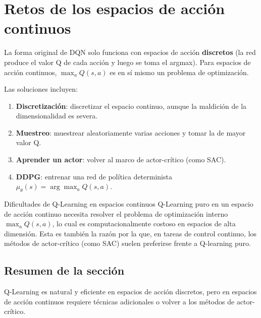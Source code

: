 \section{Retos de los espacios de acción continuos}

La forma original de DQN solo funciona con espacios de acción \textbf{discretos} (la red produce el valor Q de cada acción y luego se toma el argmax). Para espacios de acción continuos, $\max_a Q(s,a)$ es en sí mismo un problema de optimización.

Las soluciones incluyen:
\begin{enumerate}
    \item \textbf{Discretización}: discretizar el espacio continuo, aunque la maldición de la dimensionalidad es severa.
    \item \textbf{Muestreo}: muestrear aleatoriamente varias acciones y tomar la de mayor valor Q.
    \item \textbf{Aprender un actor}: volver al marco de actor-crítico (como SAC).
    \item \textbf{DDPG}: entrenar una red de política determinista $\mu_\theta(s) = \arg\max_a Q(s,a)$.
\end{enumerate}

\begin{warningbox}{Dificultades de Q-Learning en espacios continuos}
Q-Learning puro en un espacio de acción continuo necesita resolver el problema de optimización interno $\max_a Q(s,a)$, lo cual es computacionalmente costoso en espacios de alta dimensión. Esta es también la razón por la que, en tareas de control continuo, los métodos de actor-crítico (como SAC) suelen preferirse frente a Q-learning puro.
\end{warningbox}

\subsection{Resumen de la sección}
 
Q-Learning es natural y eficiente en espacios de acción discretos, pero en espacios de acción continuos requiere técnicas adicionales o volver a los métodos de actor-crítico.

